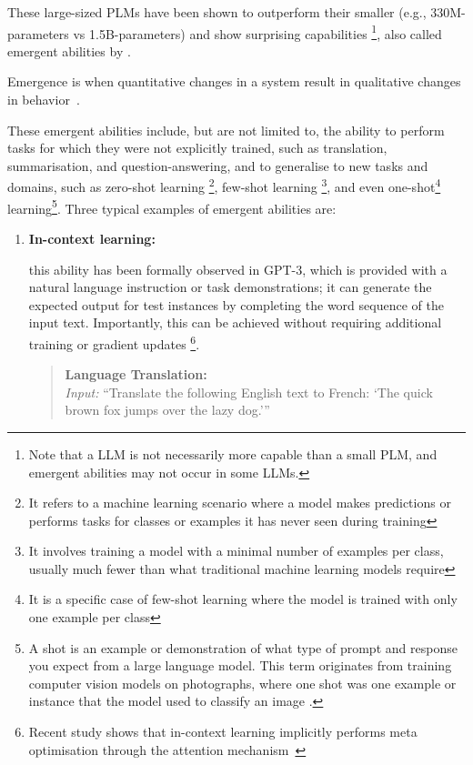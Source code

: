 \begin{enumerate}
{\begin{itemize}
		      \end{itemize}
		      These large-sized PLMs have been shown to outperform their smaller (e.g., 330M-parameters vs 1.5B-parameters) and show surprising capabilities \footnote{Note that a LLM is not necessarily more capable than a small PLM, and emergent abilities may not occur in some LLMs.}, also called emergent abilities by \textcite{wei2022emergent}.
		      \begin{displayquote}
			      Emergence is when quantitative changes in a system result in qualitative changes in behavior~\cite{anderson1972more}.
		      \end{displayquote}
		      These emergent abilities include, but are not limited to, the ability to perform tasks for which they were not explicitly trained, such as translation, summarisation, and question-answering, and to generalise to new tasks and domains, such as zero-shot learning \footnote{It refers to a machine learning scenario where a model makes predictions or performs tasks for classes or examples it has never seen during training}, few-shot learning \footnote{It involves training a model with a minimal number of examples per class, usually much fewer than what traditional machine learning models require}, and even one-shot\footnote{It is a specific case of few-shot learning where the model is trained with only one example per class} learning\footnote{A shot is an example or demonstration of what type of prompt and response you expect from a large language model. This term originates from training computer vision models on photographs, where one shot was one example or instance that the model used to classify an image \cite{feifei2006onedatacoltut}.}.
		      Three typical examples of emergent abilities are:
		      \begin{enumerate}
			      \item \textbf{In-context learning:} {this ability has been formally observed in GPT-3, which is provided with a natural language instruction or task demonstrations; it can generate the expected output for test instances by completing the word sequence of the input text. Importantly, this can be achieved without requiring additional training or gradient updates \footnote{Recent study shows that in-context learning implicitly performs meta optimisation through the attention mechanism~\cite {dai2022why}}.
				            \begin{quote}
					            \textbf{Language Translation:} \\
					            \textit{Input:} {\enquote{Translate the following English text to French: `The quick brown fox jumps over the lazy dog.'}} \\

\end{quote}}
\end{enumerate}}
\end{enumerate}

